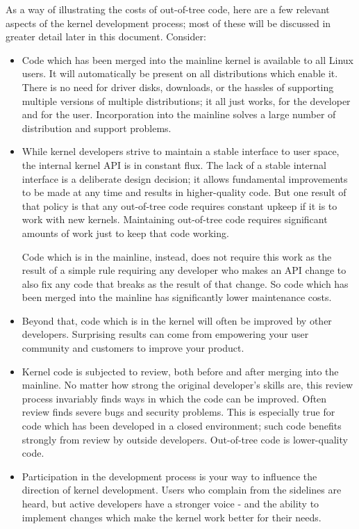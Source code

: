 \documentclass[a4paper,8pt,english]{sphinxmanual}
\begin{document}
As a way of illustrating the costs of out-of-tree code, here are a few
relevant aspects of the kernel development process; most of these will be
discussed in greater detail later in this document.  Consider:
\begin{itemize}
\item {} 
Code which has been merged into the mainline kernel is available to all
Linux users.  It will automatically be present on all distributions which
enable it.  There is no need for driver disks, downloads, or the hassles
of supporting multiple versions of multiple distributions; it all just
works, for the developer and for the user.  Incorporation into the
mainline solves a large number of distribution and support problems.

\item {} 
While kernel developers strive to maintain a stable interface to user
space, the internal kernel API is in constant flux.  The lack of a stable
internal interface is a deliberate design decision; it allows fundamental
improvements to be made at any time and results in higher-quality code.
But one result of that policy is that any out-of-tree code requires
constant upkeep if it is to work with new kernels.  Maintaining
out-of-tree code requires significant amounts of work just to keep that
code working.

Code which is in the mainline, instead, does not require this work as the
result of a simple rule requiring any developer who makes an API change
to also fix any code that breaks as the result of that change.  So code
which has been merged into the mainline has significantly lower
maintenance costs.

\item {} 
Beyond that, code which is in the kernel will often be improved by other
developers.  Surprising results can come from empowering your user
community and customers to improve your product.

\item {} 
Kernel code is subjected to review, both before and after merging into
the mainline.  No matter how strong the original developer's skills are,
this review process invariably finds ways in which the code can be
improved.  Often review finds severe bugs and security problems.  This is
especially true for code which has been developed in a closed
environment; such code benefits strongly from review by outside
developers.  Out-of-tree code is lower-quality code.

\item {} 
Participation in the development process is your way to influence the
direction of kernel development.  Users who complain from the sidelines
are heard, but active developers have a stronger voice - and the ability
to implement changes which make the kernel work better for their needs.


\end{itemize}
\end{document}
